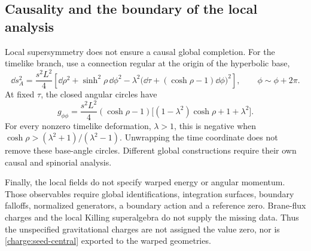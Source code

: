 \subsection{Causality and the boundary of the local analysis}
Local supersymmetry does not ensure a causal global completion. For the timelike branch, use a connection regular at the origin of the hyperbolic base,
\begin{equation}
\dd s_A^2=\frac{s^2L^2}{4}\left[
\dd\rho^2+\sinh^2\rho\,\dd\phi^2
-\lambda^2\big(\dd\tau+(\cosh\rho-1)\dd\phi\big)^2\right],
\qquad\phi\sim\phi+2\pi.
\end{equation}
At fixed $\tau$, the closed angular circles have
\begin{equation}
g_{\phi\phi}=\frac{s^2L^2}{4}(\cosh\rho-1)
\big[(1-\lambda^2)\cosh\rho+1+\lambda^2\big].
\end{equation}
For every nonzero timelike deformation, $\lambda>1$, this is negative when
$\cosh\rho>(\lambda^2+1)/(\lambda^2-1)$. Unwrapping the time coordinate does not remove these base-angle circles. Different global constructions require their own causal and spinorial analysis.

Finally, the local fields do not specify warped energy or angular momentum. Those observables require global identifications, integration surfaces, boundary falloffs, normalized generators, a boundary action and a reference zero. Brane-flux charges and the local Killing superalgebra do not supply the missing data. Thus the unspecified gravitational charges are not assigned the value zero, nor is \eqref{charge:seed-central} exported to the warped geometries.
